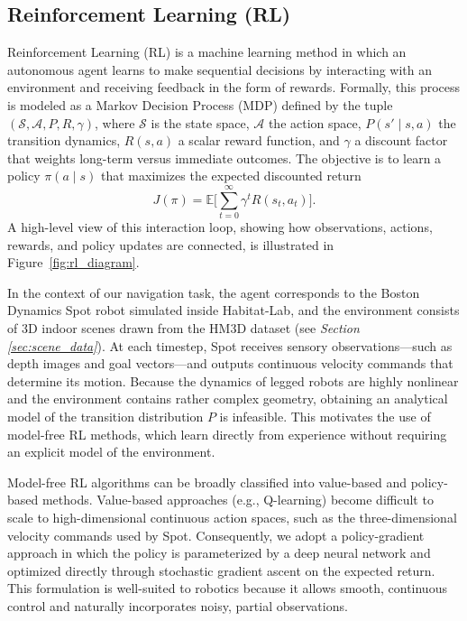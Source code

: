 \documentclass{article} %
\begin{document}
\subsection{Reinforcement Learning (RL)}
Reinforcement Learning (RL) is a machine learning method in which an autonomous agent learns to make sequential decisions by interacting with an environment and receiving feedback in the form of rewards. Formally, this process is modeled as a Markov Decision Process (MDP) defined by the tuple $(\mathcal{S},\mathcal{A},P,R,\gamma)$, where $\mathcal{S}$ is the state space, $\mathcal{A}$ the action space, $P(s' \mid s, a)$ the transition dynamics, $R(s,a)$ a scalar reward function, and $\gamma$ a discount factor that weights long-term versus immediate outcomes. The objective is to learn a policy $\pi(a \mid s)$ that maximizes the expected discounted return
\begin{equation}
J(\pi) = \mathbb{E}\Big[\sum_{t=0}^\infty \gamma^t R(s_t,a_t)\Big].
\end{equation}
A high-level view of this interaction loop, showing how observations, actions, rewards, and policy updates are connected, is illustrated in Figure~\ref{fig:rl_diagram}.

In the context of our navigation task, the agent corresponds to the Boston Dynamics Spot robot simulated inside Habitat-Lab, and the environment consists of 3D indoor scenes drawn from the HM3D dataset (see \textit{Section \ref{sec:scene_data}}). At each timestep, Spot receives sensory observations---such as depth images and goal vectors---and outputs continuous velocity commands that determine its motion. Because the dynamics of legged robots are highly nonlinear and the environment contains rather complex geometry, obtaining an analytical model of the transition distribution $P$ is infeasible. This motivates the use of model-free RL methods, which learn directly from experience without requiring an explicit model of the environment.

Model-free RL algorithms can be broadly classified into value-based and policy-based methods. Value-based approaches (e.g., Q-learning) become difficult to scale to high-dimensional continuous action spaces, such as the three-dimensional velocity commands used by Spot. Consequently, we adopt a policy-gradient approach in which the policy is parameterized by a deep neural network and optimized directly through stochastic gradient ascent on the expected return. This formulation is well-suited to robotics because it allows smooth, continuous control and naturally incorporates noisy, partial observations.
\end{document}
